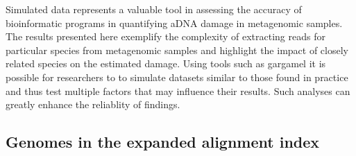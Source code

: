 \documentclass[12pt, a4paper]{article}
\renewcommand{\sectionmark}[1]{\markright{#1}{}}
\begin{document}
{Simulated data represents a valuable tool in assessing the accuracy of bioinformatic programs in quantifying aDNA damage in metagenomic samples. 
The results presented here exemplify the complexity of extracting reads for particular species from metagenomic samples and highlight the impact of closely related species on the estimated damage. 
Using tools such as gargamel it is possible for researchers to to simulate datasets similar to those found in practice and thus test multiple factors that may influence their results. 
Such analyses can greatly enhance the reliablity of findings.


\clearpage
\singlespace



\newpage
\begin{appendices}

\sectionfont{\large}
\section{Genomes in the expanded alignment index}\label{appendix:expandedGenomesList}


\end{appendices}}
\end{document}
